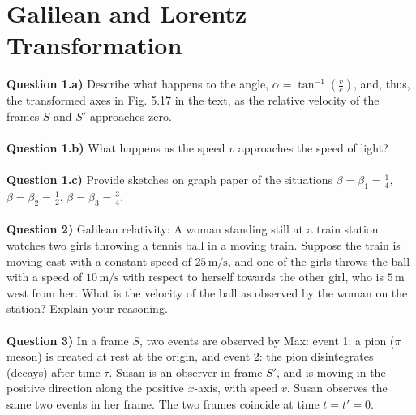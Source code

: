 \documentclass[12pt]{article}
\begin{document}


\section{Galilean and Lorentz Transformation}
\noindent \textbf{Question 1.a)} Describe what happens to the angle, $\alpha = \tan^{-1}\left(\frac{v}{c}\right)$, and, thus, the transformed axes in Fig. 5.17 in the text, as the relative velocity of the frames $S$ and $S'$ approaches zero.\\
\\
\noindent \textbf{Question 1.b)} What happens as the speed $v$ approaches the speed of light?\\
\\
\noindent \textbf{Question 1.c)} Provide sketches on graph paper of the situations $\beta = \beta_1 = \frac{1}{4}$, $\beta = \beta_2 = \frac{1}{2}$, $\beta = \beta_3 = \frac{3}{4}$.\\
\\
\noindent \textbf{Question 2)} Galilean relativity: A woman standing still at a train station watches two girls throwing a tennis ball in a moving train. Suppose the train is moving east with a constant speed of $25 \, \text{m/s}$, and one of the girls throws the ball with a speed of $10 \, \text{m/s}$ with respect to herself towards the other girl, who is $5 \, \text{m}$ west from her. What is the velocity of the ball as observed by the woman on the station? Explain your reasoning.\\
\\
\noindent \textbf{Question 3)} In a frame $S$, two events are observed by Max: event 1: a pion ($\pi$ meson) is created at rest at the origin, and event 2: the pion disintegrates (decays) after time $\tau$. Susan is an observer in frame $S'$, and is moving in the positive direction along the positive $x$-axis, with speed $v$. Susan observes the same two events in her frame. The two frames coincide at time $t = t' = 0$.\\
\end{document}
